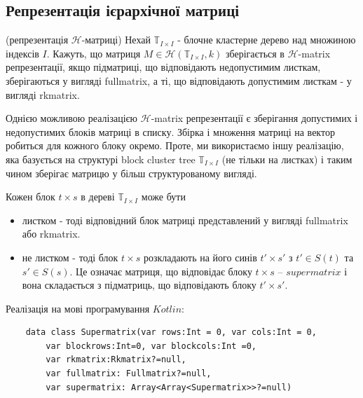 \documentclass[12pt]{report}
\begin{document}
	\subsection{Репрезентація ієрархічної матриці}
	\begin{Def}
		(репрезентація $\mathcal{H}$-матриці)  Нехай $\mathbb{T}_{I\times I}$ - блочне кластерне дерево над множиною індексів $I$. Кажуть, що матриця $M\in\mathcal{H}(\mathbb{T}_{I\times I},k)$ зберігається в $\mathcal{H}$-matrix репрезентації, якщо підматриці, що відповідають недопустимим листкам, зберігаються у вигляді fullmatrix, а ті, що відповідають допустимим листкам - у вигляді rkmatrix. 
	\end{Def}
	\par Однією можливою реалізацією $\mathcal{H}$-matrix репрезентації є зберігання допустимих і недопустимих блоків матриці в списку. Збірка і множення матриці на вектор робиться для кожного блоку окремо. Проте, ми використаємо іншу реалізацію, яка базується на структурі block cluster tree $\mathbb{T}_{I\times I}$ (не тільки на листках) і таким чином зберігає матрицю у більш структурованому вигляді.
	\par Кожен блок $t\times s$ в дереві $\mathbb{T}_{I\times I}$ може бути 
	\begin{itemize}
		\item листком - тоді відповідний блок матриці представлений у вигляді fullmatrix або rkmatrix.
		\item не листком - тоді блок $t\times s$ розкладають на його синів $t'\times s'$ з $t'\in S(t)$ та $s' \in S(s)$. Це означає матриця, що відповідає блоку $t\times s$ -- $supermatrix$ і вона складається з підматриць, що відповідають блоку $t'\times s'$.
	\end{itemize} 
	\par Реалізація на мові програмування $Kotlin$:
	\begin{verbatim}
	data class Supermatrix(var rows:Int = 0, var cols:Int = 0,
	    var blockrows:Int=0, var blockcols:Int =0,
	    var rkmatrix:Rkmatrix?=null,
	    var fullmatrix: Fullmatrix?=null, 
	    var supermatrix: Array<Array<Supermatrix>>?=null)
	
	\end{verbatim}
\end{document}
